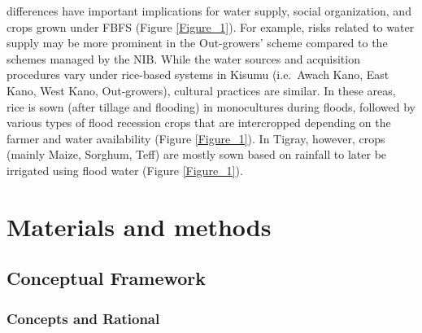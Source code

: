 \documentclass[11pt,preprint]{article}
\begin{document}
differences have important implications for water supply, social
organization, and crops grown under FBFS (Figure \ref{Figure_1}). For
example, risks related to water supply may be more prominent in the
Out-growers' scheme compared to the schemes managed by the NIB. While
the water sources and acquisition procedures vary under rice-based
systems in Kisumu (i.e.~Awach Kano, East Kano, West Kano, Out-growers),
cultural practices are similar. In these areas, rice is sown (after
tillage and flooding) in monocultures during floods, followed by various
types of flood recession crops that are intercropped depending on the
farmer and water availability (Figure \ref{Figure_1}). In Tigray,
however, crops (mainly Maize, Sorghum, Teff) are mostly sown based on
rainfall to later be irrigated using flood water (Figure
\ref{Figure_1}).

\hypertarget{materials-and-methods}{%
\section{Materials and methods}\label{materials-and-methods}}

\hypertarget{conceptual-framework}{%
\subsection{Conceptual Framework}\label{conceptual-framework}}

\hypertarget{concepts-and-rational}{%
\subsubsection{Concepts and Rational}\label{concepts-and-rational}}
\end{document}
